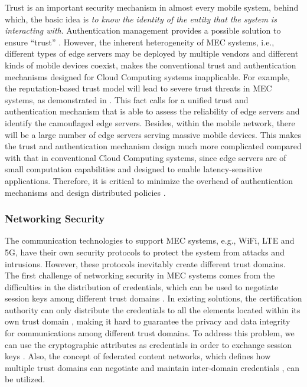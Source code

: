 \documentclass[journal]{IEEEtran}
\begin{document}
{Trust is an important security mechanism in almost every mobile system, behind which, the basic idea is \emph{to know the identity of the entity that the system is interacting with}. Authentication management provides a possible solution to ensure ``trust'' \cite{RomanLM16}. However, the inherent heterogeneity of MEC systems, i.e., different types of edge servers may be deployed by multiple vendors and different kinds of mobile devices coexist, makes the conventional trust and authentication mechanisms designed for Cloud Computing systems inapplicable. For example, the reputation-based trust model will lead to severe trust threats in MEC systems, as demonstrated in \cite{SYiWASA1508}. This fact calls for a unified trust and authentication mechanism that is able to assess the reliability of edge servers and identify the camouflaged edge servers. Besides, within the mobile network, there will be a large number of edge servers serving massive mobile devices. This makes the trust and authentication mechanism design much more complicated compared with that in conventional Cloud Computing systems, since edge servers are of small computation capabilities and designed to enable latency-sensitive applications. Therefore, it is critical to minimize the overhead of authentication mechanisms and design distributed policies \cite{FoudaTSG1112,AhmedIACC1302}.

\subsubsection{\textbf{Networking Security}}

The communication technologies to support MEC systems, e.g., WiFi, LTE and 5G, have their own security protocols to protect the system from attacks and intrusions. However, these protocols inevitably create different trust domains. The first challenge of networking security in MEC systems comes from the difficulties in the distribution of credentials, which can be used to negotiate session keys among different trust domains \cite{RomanLM16}. In existing solutions, the certification authority can only distribute the credentials to all the elements located within its own trust domain \cite{RomanLM16}, making it hard to guarantee the privacy and data integrity for communications among different trust domains. To address this problem, we can use the cryptographic attributes as credentials in order to exchange session keys \cite{XHuang14TDSC,Gorantla1007}. Also, the concept of federated content networks, which defines how multiple trust domains can negotiate and maintain inter-domain credentials \cite{PimentelComptCommun1509}, can be utilized.

}
\end{document}
